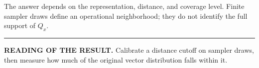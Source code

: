 \documentclass[10pt,letterpaper]{article}
\theoremstyle{typed}
\begin{document}
The answer depends on the representation, distance, and coverage level. Finite sampler draws define an operational neighborhood; they do not identify the full support of $Q_x$.

\vfill
\noindent\rule{\textwidth}{0.35pt}\par
{\small\bfseries READING OF THE RESULT.} Calibrate a distance cutoff on sampler draws, then measure how much of the original vector distribution falls within it.
\end{document}
